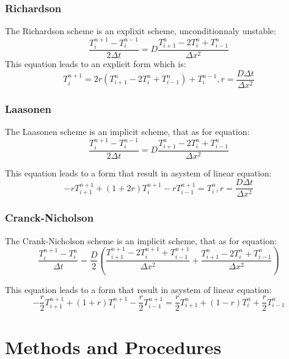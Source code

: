 \documentclass [10 pt, a4 paper]{article}
\begin{document}
\subsubsection{Richardson}
The Richardson scheme is an explixit scheme, unconditionnaly unstable:
\begin{equation}
    \frac{T_{i}^{n+1} - T_{i}^{n-1}}{2\Delta t} = D \frac{T_{i+1}^{n} - 2 T_{i}^{n} + T_{i-1}^{n}}{\Delta x^{2}}
\end{equation}
This equation leads to an explicit form which is:
\begin{equation}
    T_{i}^{n+1} = 2r(T_{i+1}^{n} - 2T_{i}^{n} + T_{i-1}^{n}) + T_{i}^{n-1}, r=\frac{D\Delta t}{\Delta x^{2}}
\end{equation}

\subsubsection{Laasonen}
The Laasonen scheme is an implicit scheme, that as for equation:
\begin{equation}
    \frac{T_{i}^{n+1} - T_{i}^{n-1}}{2\Delta t} = D\frac{T_{i+1}^{n} - 2T_{i}^{n} + T_{i-1}^{n}}{\Delta x^{2}}
\end{equation}

This equation leads to a form that result in asystem of linear equation:
\begin{equation}
    -r T_{i+1}^{n+1} + (1+2r)T_{i}^{n+1} -rT_{i-1}^{n+1} =T_{i}^{n}, r=\frac{D\Delta t}{\Delta x^{2}}
\end{equation}

\subsubsection{Cranck-Nicholson}
The Crank-Nicholson scheme is an implicit scheme, that as for equation:
\begin{equation} 
    \frac{T_{i}^{n+1} - T_{i}^{n}}{\Delta t} = \frac{D}{2}(\frac{T_{i+1}^{n+1}-2T_{i}^{n+1}+T_{i-1}^{n+1}}{\Delta x^{2}} + \frac{T_{i+1}^{n}-2T_{i}^{n}+T_{i-1}^{n}}{\Delta x^{2}})
\end{equation}

This equation leads to a form that result in asystem of linear equation:
\begin{equation}
    -\frac{r}{2} T_{i+1}^{n+1}+(1+r)T_{i}^{n+1}-\frac{r}{2}T_{i-1}^{n+1} = \frac{r}{2}T_{i+1}^{n} + (1-r)T_{i}^{n} + \frac{r}{2}T_{i-1}^{n}
\end{equation}
\quad


\section{Methods and Procedures}
 
\end{document}
